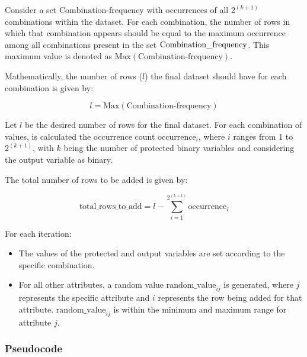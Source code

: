 Consider a set \( \text{Combination-frequency} \) with occurrences of all \( 2^{(k+1)} \) combinations within the dataset. For each combination, the number of rows in which that combination appears should be equal to the maximum occurrence among all combinations present in the set \( \text{Combination\textunderscore frequency} \). This maximum value is denoted as \( \text{Max}(\text{Combination-frequency}) \).

Mathematically, the number of rows (\( l \)) the final dataset should have for each combination is given by:

\[
l = \text{Max}(\text{Combination-frequency})
\]



Let \( l \) be the desired number of rows for the final dataset. For each combination of values, is calculated the occurrence count \( \text{occurrence}_i \), where \( i \) ranges from 1 to \( 2^{(k+1)} \), with \( k \) being the number of protected binary variables and considering the output variable as binary.

The total number of rows to be added is given by:

\[
\text{total\_rows\_to\_add} = l - \sum_{i=1}^{2^{(k+1)}} \text{occurrence}_i
\]

For each iteration:

\begin{itemize}

    \item The values of the protected and output variables are set according to the specific combination.
    
    \item For all other attributes, a random value \( \text{random\_value}_{ij} \) is generated, where \( j \) represents the specific attribute and \( i \) represents the row being added for that attribute. \( \text{random\_value}_{ij} \) is within the minimum and maximum range for attribute \( j \).

\end{itemize}

\subsubsection{Pseudocode}

